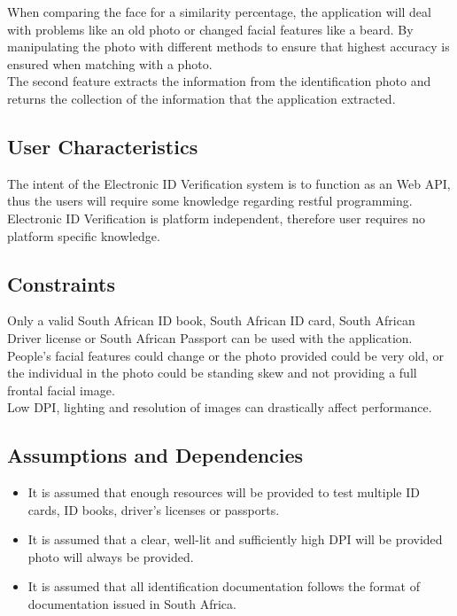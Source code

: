 \documentclass{article}
\def \project{Electronic ID Verification }
\begin{document}
		  \noindent When comparing the face for a similarity percentage, the application will deal with problems like an old photo or changed facial features like a beard. By manipulating the photo with different methods to ensure that highest accuracy is ensured when matching with a photo.\\
		  
		  \noindent The second feature extracts the information from the identification photo and returns the collection of the information that the application extracted.

		\subsection{User Characteristics}\label{subsec:overall-user-characteristics}
		    The intent of the \project system is to function as an Web API, thus the users will require some knowledge regarding restful programming. \project is platform independent, therefore user requires no platform specific knowledge.

		\subsection{Constraints}\label{subsec:overall-constraints}
			Only a valid South African ID book, South African ID card, South African Driver license or South African Passport can be used with the application.\\
			
			\noindent People's facial features could change or the photo provided could be very old, or the individual in the photo could be standing skew and not providing a full frontal facial image.\\

			\noindent Low DPI, lighting and resolution of images can drastically    affect performance.

		\subsection{Assumptions and Dependencies}\label{subsec:overall-asusmptions-and-dependencies}
		\begin{itemize}
		    \item It is assumed that enough resources will be provided to test multiple ID cards, ID books, driver's licenses or passports.
		    \item It is assumed that a clear, well-lit and sufficiently high DPI will be provided photo will always be provided.
		    \item It is assumed that all identification documentation follows the format of documentation issued in South Africa.
		\end{itemize}
			
\end{document}
